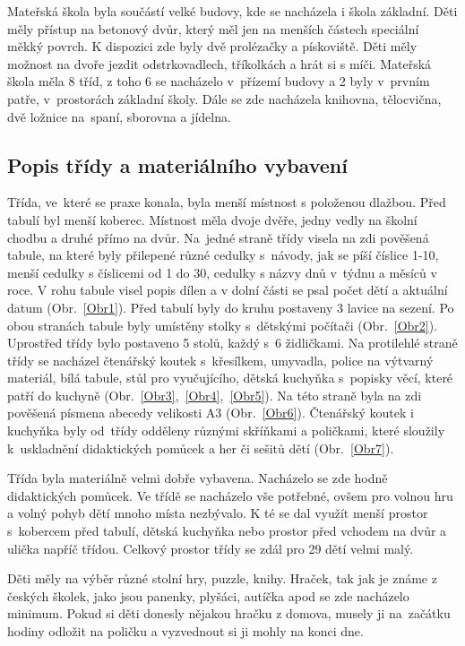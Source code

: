 			Mateřská škola byla součástí velké budovy, kde se nacházela i škola základní. Děti měly přístup na betonový dvůr, který měl jen na menších částech speciální měkký povrch. K dispozici zde byly dvě prolézačky a pískoviště. Děti měly možnost na dvoře jezdit odstrkovadlech, tříkolkách a hrát si s míči. 
			Mateřská škola měla 8 tříd, z toho 6 se nacházelo v přízemí budovy a 2 byly v prvním patře, v prostorách základní školy. Dále se zde nacházela knihovna, tělocvična, dvě ložnice na spaní, sborovna a jídelna. 

		\subsection{Popis třídy a materiálního vybavení}
		\label{tridaVybaveni}
			Třída, ve které se praxe konala, byla menší místnost s položenou dlažbou. Před tabulí byl menší koberec. Místnost měla dvoje dvěře, jedny vedly na školní chodbu a druhé přímo na dvůr.
			Na jedné straně třídy visela na zdi pověšená tabule, na které byly přilepené různé cedulky s návody, jak se píší číslice 1-10, menší cedulky s číslicemi od 1 do 30, cedulky s názvy dnů v týdnu a měsíců v roce. V rohu tabule visel popis dílen a v dolní části se psal počet dětí a aktuální datum (Obr.~\ref{Obr1}). Před tabulí byly do kruhu postaveny 3 lavice na sezení. Po obou stranách tabule byly umístěny stolky s dětskými počítači (Obr.~\ref{Obr2}). Uprostřed třídy bylo postaveno 5 stolů, každý s 6 židličkami. Na protilehlé straně třídy se nacházel čtenářský koutek s křesílkem, umyvadla, police na výtvarný materiál, bílá tabule, stůl pro vyučujícího, dětská kuchyňka s popisky věcí, které patří do kuchyně (Obr.~\ref{Obr3},~\ref{Obr4},~\ref{Obr5}). Na této straně byla na zdi pověšená písmena abecedy velikosti A3 (Obr.~\ref{Obr6}). Čtenářský koutek i kuchyňka byly od třídy odděleny různými skříňkami a poličkami, které sloužily k uskladnění didaktických pomůcek a her či sešitů dětí (Obr.~\ref{Obr7}).

			Třída byla materiálně velmi dobře vybavena. Nacházelo se zde hodně didaktických pomůcek. Ve třídě se nacházelo vše potřebné, ovšem pro volnou hru a volný pohyb dětí mnoho místa nezbývalo. K té se dal využít menší prostor s kobercem před tabulí, dětská kuchyňka nebo prostor před vchodem na dvůr a ulička napříč třídou. Celkový prostor třídy se zdál pro 29 dětí velmi malý.

			Děti měly na výběr různé stolní hry, puzzle, knihy. Hraček, tak jak je známe z českých školek, jako jsou panenky, plyšáci, autíčka apod se zde nacházelo minimum. Pokud si děti donesly nějakou hračku z domova, musely ji na začátku hodiny odložit na poličku a vyzvednout si ji mohly na konci dne. 


